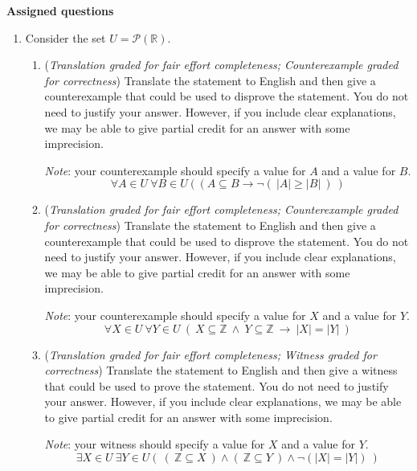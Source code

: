 \documentclass[12pt, oneside]{article}
\begin{document}
\newpage
{\bf Assigned questions}

\begin{enumerate}
    \item Consider the set $U = \mathcal{P}(\mathbb{R})$. 
    
    \begin{enumerate}
        \item ({\it Translation graded for fair effort completeness; Counterexample graded 
        for correctness})  Translate the statement to English and then give a counterexample 
        that could be used to disprove the statement. You do not need to justify your answer.  
        However, if you include clear explanations, 
        we may be able to give partial credit for an answer with some imprecision.

        {\it Note}: your counterexample should specify a value for $A$ and a value for $B$.
        \[
            \forall A \in U ~\forall B \in U~(~( A \subseteq B \to \lnot (~|A| \geq |B|~)~)
        \]
        \item ({\it Translation graded for fair effort completeness; Counterexample graded 
        for correctness})  Translate the statement to English and then give a counterexample 
        that could be used to disprove the statement. You do not need to justify your answer.  
        However, if you include clear explanations, 
        we may be able to give partial credit for an answer with some imprecision.

        {\it Note}: your counterexample should specify a value for $X$ and a value for $Y$.
        \[
            \forall X \in U~\forall Y \in U~( ~X \subseteq \mathbb{Z}~\land~ Y \subseteq \mathbb{Z} ~\to~  |X|  = |Y| ~)
        \]
        \item ({\it Translation graded for fair effort completeness; Witness graded 
        for correctness})  Translate the statement to English and then give a witness 
        that could be used to prove the statement. You do not need to justify your answer.  
        However, if you include clear explanations, 
        we may be able to give partial credit for an answer with some imprecision.

        {\it Note}: your witness should specify a value for $X$ and a value for $Y$.
        \[
            \exists X \in U~ \exists Y \in U (~(~\mathbb{Z} \subseteq X~) \land
            (~\mathbb{Z} \subseteq Y~) \land \neg ( |X| = |Y|)~)
        \]
    \end{enumerate}


\end{enumerate}
\end{document}
